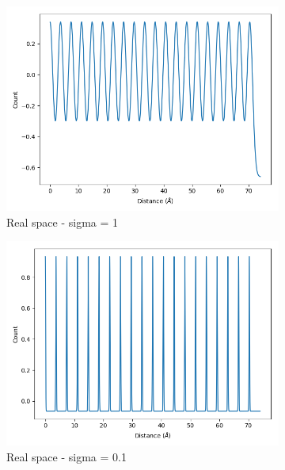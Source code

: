 \documentclass{article}
\begin{document}
\begin{figure}
        \begin{subfigure}{0.33\textwidth}
                \centering
                \includegraphics[width=\textwidth]{real_gauss_1d_highsig.png}
                \caption{Real space - sigma = 1}\label{fig:real_gauss_1d_highsig}
        \end{subfigure}
        \begin{subfigure}{0.33\textwidth}
                \centering
                \includegraphics[width=\textwidth]{real_gauss_1d_medsig.png}
                \caption{Real space - sigma = 0.1}\label{fig:real_gauss_1d_medsig}
        \end{subfigure}
	\begin{subfigure}{0.33\textwidth}

\end{subfigure}
\end{figure}
\end{document}
